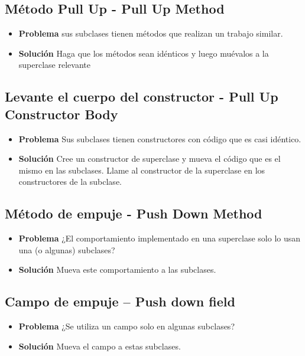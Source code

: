 \documentclass[11pt,a4paper,oneside]{book}
\begin{document}
\subsection{Método Pull Up - Pull Up Method}
\label{renombrarmetodo}
\begin{itemize}
    \item \textbf{Problema} sus subclases tienen métodos que realizan un trabajo similar.
    \item \textbf{Solución} Haga que los métodos sean idénticos y luego muévalos a la superclase relevante
\end{itemize}

\subsection{Levante el cuerpo del constructor - Pull Up Constructor Body}
\label{renombrarmetodo}
\begin{itemize}
    \item \textbf{Problema} Sus subclases tienen constructores con código que es casi idéntico.
    \item \textbf{Solución} Cree un constructor de superclase y mueva el código que es el mismo en las subclases. Llame al constructor de la superclase en los constructores de la subclase.
\end{itemize}


\subsection{Método de empuje - Push Down Method}
\label{renombrarmetodo}
\begin{itemize}
    \item \textbf{Problema} ¿El comportamiento implementado en una superclase solo lo usan una (o algunas) subclases?
    \item \textbf{Solución} Mueva este comportamiento a las subclases.
\end{itemize}

\subsection{Campo de empuje – Push down field}
\label{renombrarmetodo}
\begin{itemize}
    \item \textbf{Problema} ¿Se utiliza un campo solo en algunas subclases?
    \item \textbf{Solución} Mueva el campo a estas subclases.
\end{itemize}
\end{document}
